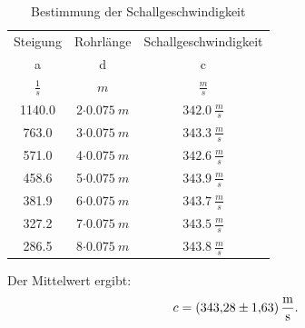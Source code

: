 \begin{table}
  \centering
  \caption{Bestimmung der Schallgeschwindigkeit}
  \label{Tab1}
    \begin{tabular}{c c c}
      \toprule
      Steigung&Rohrlänge&Schallgeschwindigkeit\\
      a&d&c\\
      \midrule
      $\si{\frac{1}{s}}$&$\si{m}$&$\si{\frac{m}{s}}$\\
      \midrule
      \midrule
       1140.0 & 2$\cdot\SI{0.075}{m}$ & $\SI{342.0}{\frac{m}{s}}$\\
       763.0  & 3$\cdot\SI{0.075}{m}$ & $\SI{343.3}{\frac{m}{s}}$\\
       571.0  & 4$\cdot\SI{0.075}{m}$ & $\SI{342.6}{\frac{m}{s}}$\\
       458.6  & 5$\cdot\SI{0.075}{m}$ & $\SI{343.9}{\frac{m}{s}}$\\
       381.9  & 6$\cdot\SI{0.075}{m}$ & $\SI{343.7}{\frac{m}{s}}$\\
       327.2  & 7$\cdot\SI{0.075}{m}$ & $\SI{343.5}{\frac{m}{s}}$\\
       286.5  & 8$\cdot\SI{0.075}{m}$ & $\SI{343.8}{\frac{m}{s}}$\\
      \bottomrule
    \end{tabular}
\end{table}
Der Mittelwert ergibt:
\begin{align*}
  c=\SI{343.28\pm1.63}{\frac{m}{s}}.
\end{align*}
